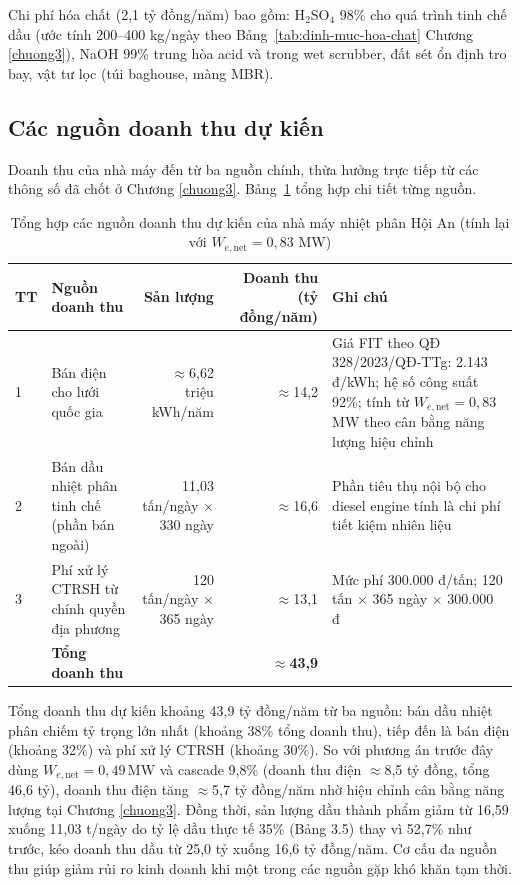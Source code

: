\documentclass[../main.tex]{subfiles}
\begin{document}
Chi phí hóa chất (2,1 tỷ đồng/năm) bao gồm: H$_2$SO$_4$ 98\% cho quá trình tinh chế dầu (ước tính 200--400 kg/ngày theo Bảng~\ref{tab:dinh-muc-hoa-chat} Chương \ref{chuong3}), NaOH 99\% trung hòa acid và trong wet scrubber, đất sét ổn định tro bay, vật tư lọc (túi baghouse, màng MBR).

\subsection{Các nguồn doanh thu dự kiến}

Doanh thu của nhà máy đến từ ba nguồn chính, thừa hưởng trực tiếp từ các thông số đã chốt ở Chương \ref{chuong3}. Bảng~\ref{tab:doanh-thu-nguon} tổng hợp chi tiết từng nguồn.

\begin{table}[H]
\caption{Tổng hợp các nguồn doanh thu dự kiến của nhà máy nhiệt phân Hội An (tính lại với $W_{e,\text{net}} = 0{,}83$ MW)}
\label{tab:doanh-thu-nguon}
\centering
\begin{tabular}{p{}p{}r r p{}}
\toprule
\textbf{TT} & \textbf{Nguồn doanh thu} & \textbf{Sản lượng} & \textbf{Doanh thu (tỷ đồng/năm)} & \textbf{Ghi chú} \\
\midrule
1 & Bán điện cho lưới quốc gia & $\approx$6,62 triệu kWh/năm & $\approx$14,2 & Giá FIT theo QĐ 328/2023/QĐ-TTg: 2.143 đ/kWh; hệ số công suất 92\%; tính từ $W_{e,\text{net}}=0{,}83$\,MW theo cân bằng năng lượng hiệu chỉnh \\
\midrule
2 & Bán dầu nhiệt phân tinh chế (phần bán ngoài) & 11,03 tấn/ngày $\times$ 330 ngày & $\approx$16,6 & Phần tiêu thụ nội bộ cho diesel engine tính là chi phí tiết kiệm nhiên liệu \\
\midrule
3 & Phí xử lý CTRSH từ chính quyền địa phương & 120 tấn/ngày $\times$ 365 ngày & $\approx$13,1 & Mức phí 300.000 đ/tấn; 120 tấn $\times$ 365 ngày $\times$ 300.000 đ \\
\midrule
 & \textbf{Tổng doanh thu} & & \textbf{$\approx$43,9} & \\
\bottomrule
\end{tabular}
\end{table}

Tổng doanh thu dự kiến khoảng 43,9 tỷ đồng/năm từ ba nguồn: bán dầu nhiệt phân chiếm tỷ trọng lớn nhất (khoảng 38\% tổng doanh thu), tiếp đến là bán điện (khoảng 32\%) và phí xử lý CTRSH (khoảng 30\%). So với phương án trước đây dùng $W_{e,\text{net}}=0{,}49$\,MW và cascade 9,8\% (doanh thu điện $\approx$8,5 tỷ đồng, tổng 46,6 tỷ), doanh thu điện tăng $\approx$5,7 tỷ đồng/năm nhờ hiệu chỉnh cân bằng năng lượng tại Chương \ref{chuong3}. Đồng thời, sản lượng dầu thành phẩm giảm từ 16,59 xuống 11,03 t/ngày do tỷ lệ dầu thực tế 35\% (Bảng 3.5) thay vì 52,7\% như trước, kéo doanh thu dầu từ 25,0 tỷ xuống 16,6 tỷ đồng/năm. Cơ cấu đa nguồn thu giúp giảm rủi ro kinh doanh khi một trong các nguồn gặp khó khăn tạm thời.
\end{document}
